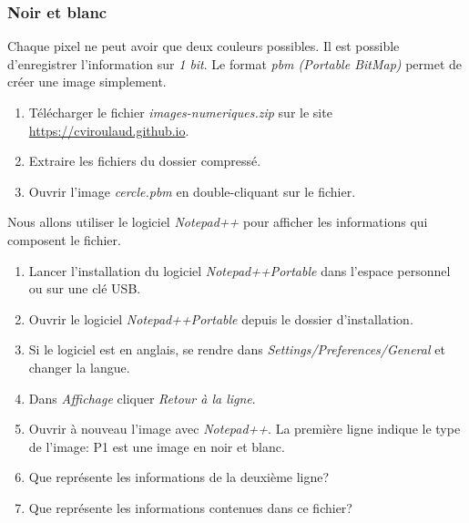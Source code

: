 \documentclass[a4paper,11pt]{article}
\begin{document}
\begin{Form}
\subsubsection{Noir et blanc}
Chaque pixel ne peut avoir que deux couleurs possibles. Il est possible d'enregistrer l'information sur \emph{1 bit}. Le format \emph{pbm (Portable BitMap)} permet de créer une image simplement.
\begin{activite}
\begin{enumerate}
\item Télécharger le fichier \emph{images-numeriques.zip} sur le site \mbox{\url{https://cviroulaud.github.io}}.
\item Extraire les fichiers du dossier compressé.
\item Ouvrir l'image \emph{cercle.pbm} en double-cliquant sur le fichier.
\end{enumerate}
Nous allons utiliser le logiciel \emph{Notepad++} pour afficher les informations qui composent le fichier. 
\begin{enumerate}[resume]
\item Lancer l'installation du logiciel \emph{Notepad++Portable} dans l'espace personnel ou sur une clé USB.
\item Ouvrir le logiciel \emph{Notepad++Portable} depuis le dossier d'installation.
\item Si le logiciel est en anglais, se rendre dans \emph{Settings/Preferences/General} et changer la langue.
\item Dans \emph{Affichage} cliquer \emph{Retour à la ligne}.
\item Ouvrir à nouveau l'image avec \emph{Notepad++}. La première ligne indique le type de l'image: P1 est une image en noir et blanc.
\item Que représente les informations de la deuxième ligne?
\item Que représente les informations contenues dans ce fichier?
\end{enumerate}
\end{activite}


\end{Form}
\end{document}
